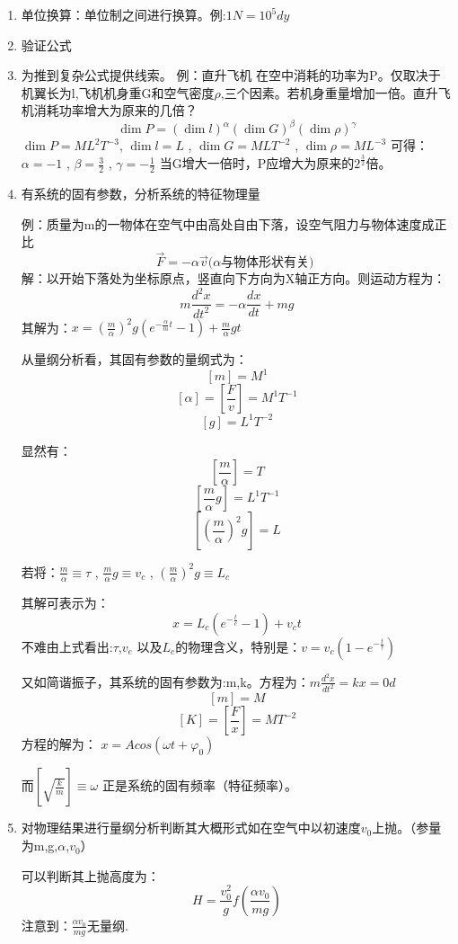 \begin{enumerate}
\item 单位换算：单位制之间进行换算。例:$1N=10^5dy$   

\item 验证公式  

\item 为推到复杂公式提供线索。  
例：直升飞机  在空中消耗的功率为P。仅取决于机翼长为l,飞机机身重G和空气密度$\rho$,三个因素。若机身重量增加一倍。直升飞机消耗功率增大为原来的几倍？$$\dim P=(\dim l)^\alpha (\dim G)^\beta (\dim \rho)^\gamma$$   $\dim P=ML^2T^{-3}$,  $\dim l=L$  ,  $\dim G=M L T^{-2}$  ,  $\dim \rho =ML^{-3}$    
可得：  $\alpha=-1$ , $\beta=\frac{3}{2}$  ,  $\gamma=-\frac{1}{2}$     
 当G增大一倍时，P应增大为原来的$2^\frac{3}{2}$倍。

\item 有系统的固有参数，分析系统的特征物理量
  
 例：质量为m的一物体在空气中由高处自由下落，设空气阻力与物体速度成正比\[ \overrightarrow{F}=-\alpha\overrightarrow{v}  \text{($\alpha$与物体形状有关)  }  \]
 解：以开始下落处为坐标原点，竖直向下方向为X轴正方向。则运动方程为：$$m \frac{d^{2}x}{dt^{2}}=-\alpha \frac{dx}{dt}+mg$$    
其解为：$x=(\frac{m}{\alpha})^2 g (e^{-\frac{\alpha}{m}t}-1)+ \frac{m}{\alpha}gt$
  
  从量纲分析看，其固有参数的量纲式为：$$[m]=M^1$$  $$[\alpha]=[\frac{F}{v}]=M^1T^{-1}$$   $$[g]=L^1T^{-2}$$  
  
  显然有：$$[\frac{m}{\alpha}]=T$$   $$[\frac{m}{\alpha}g]=L^1T^{-1}$$  $$[(\frac{m}{\alpha})^2g]=L$$ 
  
  若将：$\frac{m}{\alpha}\equiv \tau$  , $\frac{m}{\alpha}g \equiv v_c$  ,  $(\frac{m}{\alpha})^2g \equiv L_c $ 
  
  其解可表示为：$$x=L_c(e^{-\frac{t}{c}}-1)+ v_ct $$   
不难由上式看出:$\tau$,$v_e$ 以及$L_c$的物理含义，特别是：$v=v_c(1-e^{-\frac{t}{\tau}})$
  
 又如简谐振子，其系统的固有参数为:m,k。方程为：$m \frac{d^{2}x}{dt^{2}}=kx=0d$  $$[m]=M$$  $$[K]=[\frac{F}{x}]=MT^{-2}$$  方程的解为： $x=Acos(\omega t+\varphi_0)$ 
  
  而$[\sqrt{\frac{k}{m}}]\equiv \omega$ 正是系统的固有频率（特征频率）。
  
   
\item 对物理结果进行量纲分析判断其大概形式如在空气中以初速度$v_0$上抛。（参量为m,g,$\alpha$,$v_0$） 

可以判断其上抛高度为：$$H=\frac{v_0^2}{g} f ( \frac{\alpha v_0}{mg})$$ 注意到：$\frac{\alpha v_0}{mg}$无量纲.
\end{enumerate}



